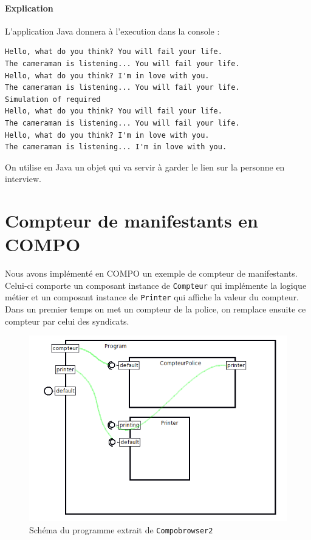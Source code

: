 \documentclass[11pt,a4paper,openany,oneside]{book}
\begin{document}
\begin{appendices}
\subsubsection{Explication}
L'application Java donnera à l'execution dans la console : \begin{lstlisting}[frame=single, caption=output]
Hello, what do you think? You will fail your life. 
The cameraman is listening... You will fail your life.
Hello, what do you think? I'm in love with you. 
The cameraman is listening... You will fail your life. 
Simulation of required 
Hello, what do you think? You will fail your life. 
The cameraman is listening... You will fail your life. 
Hello, what do you think? I'm in love with you. 
The cameraman is listening... I'm in love with you.
\end{lstlisting}
On utilise en Java un objet qui va servir à garder le lien sur la personne en interview.

\chapter{Compteur de manifestants en COMPO}

Nous avons implémenté en COMPO un exemple de compteur de manifestants. Celui-ci comporte un composant instance de \texttt{Compteur} qui implémente la logique métier et un composant instance de \texttt{Printer} qui affiche la valeur du compteur. Dans un premier temps on met un compteur de la police, on remplace ensuite ce compteur par celui des syndicats.

\begin{figure}[H]
\centering
\includegraphics[scale=0.7, keepaspectratio=true]{program}
\caption{Schéma du programme extrait de \texttt{Compobrowser2}}
\label{compteurmanifestant}
\end{figure}


\end{appendices}
\end{document}

